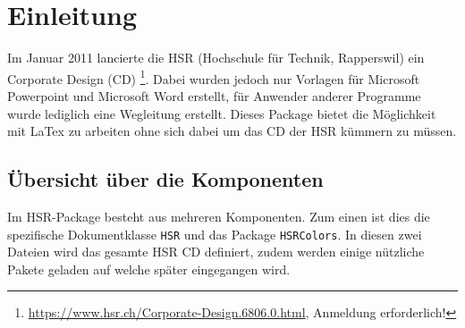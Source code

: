 \section{Einleitung}
Im Januar 2011 lancierte die HSR (Hochschule für Technik, Rapperswil) ein Corporate Design (CD)
\footnote{\href{https://www.hsr.ch/Corporate-Design.6806.0.html}{https://www.hsr.ch/Corporate-Design.6806.0.html}, Anmeldung erforderlich!}. Dabei
wurden jedoch nur Vorlagen für Microsoft Powerpoint und Microsoft Word erstellt, für Anwender anderer Programme wurde lediglich eine Wegleitung erstellt.
Dieses Package bietet die Möglichkeit mit LaTex zu arbeiten ohne sich dabei um das CD der HSR kümmern zu müssen.

\subsection{Übersicht über die Komponenten}
Im HSR-Package besteht aus mehreren Komponenten. Zum einen ist dies die spezifische Dokumentklasse \verb+HSR+ und das Package \verb+HSRColors+.
In diesen zwei Dateien wird das gesamte HSR CD definiert, zudem werden einige nützliche Pakete geladen auf welche später eingegangen wird.

